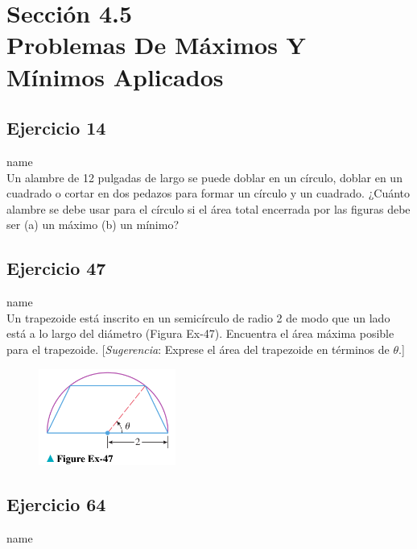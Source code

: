 \documentclass[12pt]{article}
\begin{document}
\section{Sección 4.5 \\ Problemas De Máximos Y Mínimos Aplicados}
\subsection{Ejercicio 14} name \\

Un alambre de 12 pulgadas de largo se puede doblar en un círculo, doblar en un cuadrado o cortar en dos pedazos para formar un círculo y un cuadrado. ¿Cuánto alambre se debe usar para el círculo si el área total encerrada por las figuras debe ser (a) un máximo (b) un mínimo?

\subsection{Ejercicio 47} name \\

Un trapezoide está inscrito en un semicírculo de radio 2 de modo que un lado está a lo largo del diámetro (Figura Ex-47). Encuentra el área máxima posible para el trapezoide. [\textit{Sugerencia}: Exprese el área del trapezoide en términos de $\theta$.]
\begin{figure}[H]
\centering
\includegraphics[width=0.4\textwidth]{../img/img_Lista3/3_47.png}
\end{figure}

\subsection{Ejercicio 64} name \\
\end{document}
